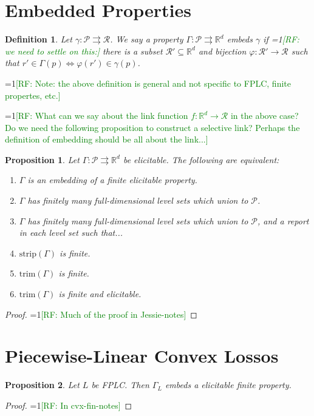 \documentclass[11pt]{article}
\newcommand{\Comments}{1}
\newcommand{\mynote}[2]{\ifnum\Comments=1\textcolor{#1}{#2}\fi}
\newcommand{\raf}[1]{\mynote{green}{[RF: #1]}}
\newcommand{\reals}{\mathbb{R}}
\renewcommand{\P}{\mathcal{P}}
\newcommand{\R}{\mathcal{R}}
\newcommand{\toto}{\rightrightarrows}
\newcommand{\trim}{\mathrm{trim}}
\newcommand{\strip}{\mathrm{strip}}
\newtheorem{proposition}{Proposition}
\newtheorem{definition}{Definition}
\begin{document}
\section{Embedded Properties}

\begin{definition}
  Let $\gamma:\P\toto\R$.
  We say a property $\Gamma:\P\toto\reals^d$ \emph{embeds $\gamma$} if \raf{we need to settle on this:} there is a subset $\R'\subseteq\reals^d$ and bijection $\varphi:\R'\to\R$ such that $r'\in\Gamma(p) \iff \varphi(r') \in \gamma(p)$.
\end{definition}
\raf{Note: the above definition is general and not specific to FPLC, finite propertes, etc.}

\raf{What can we say about the link function $f:\reals^d\to\R$ in the above case?  Do we need the following proposition to construct a selective link?  Perhaps the definition of embedding should be all about the link...}

\begin{proposition}
  Let $\Gamma:\P\toto\reals^d$ be elicitable.
  The following are equivalent:
  \begin{enumerate}
  \item $\Gamma$ is an embedding of a finite elicitable property.
  \item $\Gamma$ has finitely many full-dimensional level sets which union to $\P$.
  \item $\Gamma$ has finitely many full-dimensional level sets which union to $\P$, and a report in each level set such that...
  \item $\strip(\Gamma)$ is finite.
  \item $\trim(\Gamma)$ is finite.
  \item $\trim(\Gamma)$ is finite and elicitable.
  \end{enumerate}
\end{proposition}
\begin{proof}
  \raf{Much of the proof in Jessie-notes}
\end{proof}


\section{Piecewise-Linear Convex Lossos}

\begin{proposition}
  Let $L$ be FPLC.
  Then $\Gamma_L$ embeds a elicitable finite property.
\end{proposition}
\begin{proof}
  \raf{In cvx-fin-notes}
\end{proof}
\end{document}

